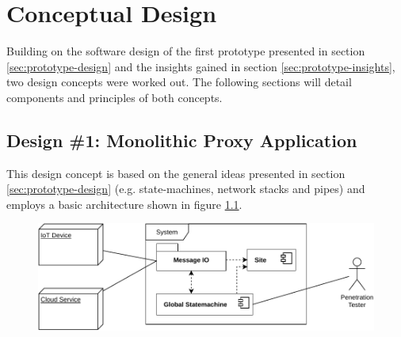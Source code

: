 \chapter{Conceptual Design}
\label{chap:conceptual-design}

Building on the software design of the first prototype presented in section \ref{sec:prototype-design} and the insights gained in section \ref{sec:prototype-insights}, two design concepts were worked out. The following sections will detail components and principles of both concepts.

\section{Design \#1: Monolithic Proxy Application}
\label{sec:design-1}
This design concept is based on the general ideas presented in section \ref{sec:prototype-design} (e.g. state-machines, network stacks and pipes) and employs a basic architecture shown in figure \ref{fig:component-view-1}.
\begin{figure}[h]
    \centering
    \includegraphics[width=12cm]{img/ch05/component-view-1.pdf}
    \label{fig:component-view-1}
\end{figure}

